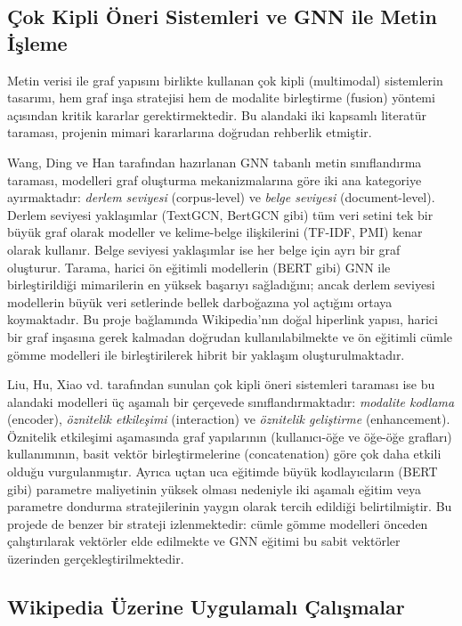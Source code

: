 \documentclass[12pt, a4paper]{article}
\begin{document}
\subsection{Çok Kipli Öneri Sistemleri ve GNN ile Metin İşleme}

Metin verisi ile graf yapısını birlikte kullanan çok kipli (multimodal) sistemlerin tasarımı, hem graf inşa stratejisi hem de modalite birleştirme (fusion) yöntemi açısından kritik kararlar gerektirmektedir. Bu alandaki iki kapsamlı literatür taraması, projenin mimari kararlarına doğrudan rehberlik etmiştir.

Wang, Ding ve Han \cite{li2022graph} tarafından hazırlanan GNN tabanlı metin sınıflandırma taraması, modelleri graf oluşturma mekanizmalarına göre iki ana kategoriye ayırmaktadır: \textit{derlem seviyesi} (corpus-level) ve \textit{belge seviyesi} (document-level). Derlem seviyesi yaklaşımlar (TextGCN, BertGCN gibi) tüm veri setini tek bir büyük graf olarak modeller ve kelime-belge ilişkilerini (TF-IDF, PMI) kenar olarak kullanır. Belge seviyesi yaklaşımlar ise her belge için ayrı bir graf oluşturur. Tarama, harici ön eğitimli modellerin (BERT gibi) GNN ile birleştirildiği mimarilerin en yüksek başarıyı sağladığını; ancak derlem seviyesi modellerin büyük veri setlerinde bellek darboğazına yol açtığını ortaya koymaktadır. Bu proje bağlamında Wikipedia'nın doğal hiperlink yapısı, harici bir graf inşasına gerek kalmadan doğrudan kullanılabilmekte ve ön eğitimli cümle gömme modelleri ile birleştirilerek hibrit bir yaklaşım oluşturulmaktadır.

Liu, Hu, Xiao vd.\@ \cite{zhou2023multimodal} tarafından sunulan çok kipli öneri sistemleri taraması ise bu alandaki modelleri üç aşamalı bir çerçevede sınıflandırmaktadır: \textit{modalite kodlama} (encoder), \textit{öznitelik etkileşimi} (interaction) ve \textit{öznitelik geliştirme} (enhancement). Öznitelik etkileşimi aşamasında graf yapılarının (kullanıcı-öğe ve öğe-öğe grafları) kullanımının, basit vektör birleştirmelerine (concatenation) göre çok daha etkili olduğu vurgulanmıştır. Ayrıca uçtan uca eğitimde büyük kodlayıcıların (BERT gibi) parametre maliyetinin yüksek olması nedeniyle iki aşamalı eğitim veya parametre dondurma stratejilerinin yaygın olarak tercih edildiği belirtilmiştir. Bu projede de benzer bir strateji izlenmektedir: cümle gömme modelleri önceden çalıştırılarak vektörler elde edilmekte ve GNN eğitimi bu sabit vektörler üzerinden gerçekleştirilmektedir.

\subsection{Wikipedia Üzerine Uygulamalı Çalışmalar}
\end{document}
